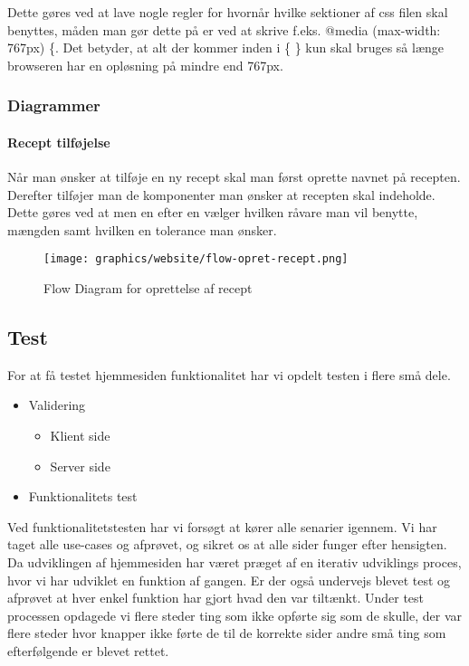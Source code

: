 \documentclass[a4paper]{article}
\begin{document}
Dette gøres ved at lave nogle regler for hvornår hvilke sektioner af css filen skal benyttes, måden man gør dette på er ved at skrive f.eks. @media (max-width: 767px) \{. Det betyder, at alt der kommer inden i \{ \} kun skal bruges så længe browseren har en opløsning på mindre end 767px.


\subsubsection{Diagrammer} %

\paragraph{Recept tilføjelse} %

Når man ønsker at tilføje en ny recept skal man først oprette navnet på recepten. Derefter tilføjer man de komponenter man ønsker at recepten skal indeholde. Dette gøres ved at men en efter en vælger hvilken råvare man vil benytte, mængden samt hvilken en tolerance man ønsker. 

\begin{figure}[H]
  \centering
  \texttt{[image: graphics/website/flow-opret-recept.png]}
  \caption{Flow Diagram for oprettelse af recept}
\end{figure}




\subsection{Test} %

For at få testet hjemmesiden funktionalitet har vi opdelt testen i flere små dele.

\begin{itemize}
  \item Validering
    \begin{itemize}
      \item Klient side
      \item Server side
    \end{itemize}
\item Funktionalitets test
\end{itemize}

Ved funktionalitetstesten har vi forsøgt at kører alle senarier igennem. Vi har taget alle use-cases og afprøvet, og sikret os at alle sider funger efter hensigten. Da udviklingen af hjemmesiden har været præget af en iterativ udviklings proces, hvor vi har udviklet en funktion af gangen. Er der også undervejs blevet test og afprøvet at hver enkel funktion har gjort hvad den var tiltænkt. Under test processen opdagede vi flere steder ting som ikke opførte sig som de skulle, der var flere steder hvor knapper ikke førte de til de korrekte sider andre små ting som efterfølgende er blevet rettet. 
\end{document}
